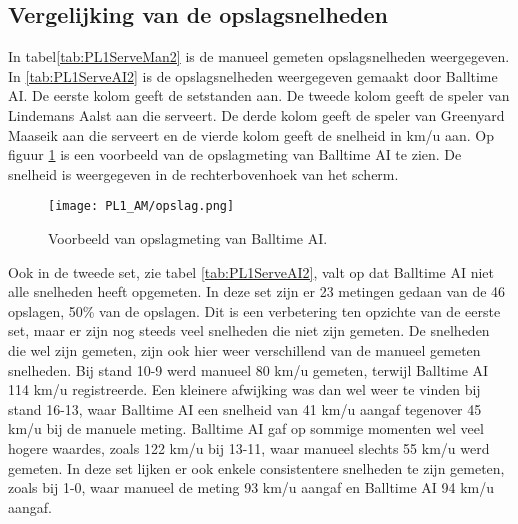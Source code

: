 \subsection{Vergelijking van de opslagsnelheden}
In tabel\ref{tab:PL1ServeMan2} is de manueel gemeten opslagsnelheden weergegeven. In \ref{tab:PL1ServeAI2} is de opslagsnelheden weergegeven gemaakt door Balltime AI. De eerste kolom geeft de setstanden aan. De tweede kolom geeft de speler van Lindemans Aalst aan die serveert. De derde kolom geeft de speler van Greenyard Maaseik aan die serveert en de vierde kolom geeft de snelheid in km/u aan. Op figuur \ref{fig:PL1_Serve} is een voorbeeld van de opslagmeting van Balltime AI te zien. De snelheid is weergegeven in de rechterbovenhoek van het scherm.

\begin{figure}
  \centering
  \texttt{[image: PL1\_AM/opslag.png]}
  \caption{\label{fig:PL1_Serve}Voorbeeld van opslagmeting van Balltime AI.}
\end{figure}

Ook in de tweede set, zie tabel \ref{tab:PL1ServeAI2}, valt op dat Balltime AI niet alle snelheden heeft opgemeten. In deze set zijn er 23 metingen gedaan van de 46 opslagen, 50\% van de opslagen. Dit is een verbetering ten opzichte van de eerste set, maar er zijn nog steeds veel snelheden die niet zijn gemeten. De snelheden die wel zijn gemeten, zijn ook hier weer verschillend van de manueel gemeten snelheden. Bij stand 10-9 werd manueel 80 km/u gemeten, terwijl Balltime AI 114 km/u registreerde. Een kleinere afwijking was dan wel weer te vinden bij stand 16-13, waar Balltime AI een snelheid van 41 km/u aangaf tegenover 45 km/u bij de manuele meting. Balltime AI gaf op sommige momenten wel veel hogere waardes, zoals 122 km/u bij 13-11, waar manueel slechts 55 km/u werd gemeten. In deze set lijken er ook enkele consistentere snelheden te zijn gemeten, zoals bij 1-0, waar manueel de meting 93 km/u aangaf en Balltime AI 94 km/u aangaf.

